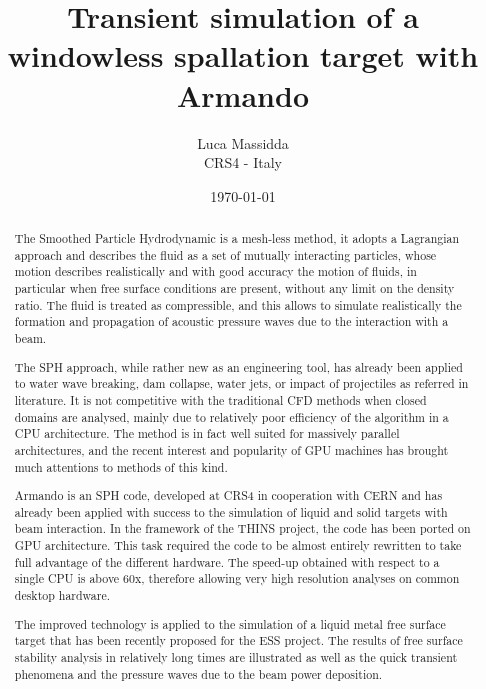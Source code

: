 \documentclass[11pt]{article}
\title{Transient simulation of a windowless spallation target with Armando}
\author{Luca Massidda\\
		CRS4 - Italy}
\date{\today}
\begin{document}
\maketitle

\begin{abstract}
The Smoothed Particle Hydrodynamic is a mesh-less method, it adopts a Lagrangian approach and describes the fluid as a set of mutually interacting particles, whose motion describes realistically and with good accuracy the motion of fluids, in particular when free surface conditions are present, without any limit on the density ratio. The fluid is treated as compressible, and this allows to simulate realistically the formation and propagation of acoustic pressure waves due to the interaction with a beam.

The SPH approach, while rather new as an engineering tool, has already been applied to water wave breaking, dam collapse, water jets, or impact of projectiles as referred in literature. It is not competitive with the traditional CFD methods when closed domains are analysed, mainly due to relatively poor efficiency of the algorithm in a CPU architecture. The method is in fact well suited for massively parallel architectures, and the recent interest and popularity of GPU machines has brought much attentions to methods of this kind.

Armando is an SPH code, developed at CRS4 in cooperation with CERN and has already been applied with success to the simulation of liquid and solid targets with beam interaction. In the framework of the THINS project, the code has been ported on GPU architecture. This task required the code to be almost entirely rewritten to take full advantage of the different hardware. The speed-up obtained with respect to a single CPU is above 60x, therefore allowing very high resolution analyses on common desktop hardware.

The improved technology is applied to the simulation of a liquid metal free surface target that has been recently proposed for the ESS project. The results of free surface stability analysis in relatively long times are illustrated as well as the quick transient phenomena and the pressure waves due to the beam power deposition.

\end{abstract}
\end{document}

